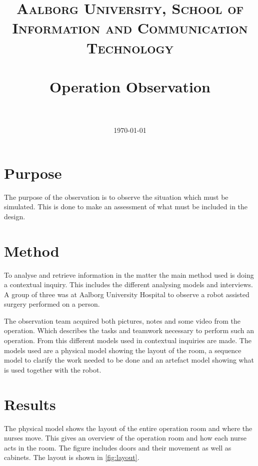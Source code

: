 \documentclass[paper=a4, fontsize=11pt]{scrartcl} %
\title{	
\normalfont \normalsize 
\textsc{Aalborg University, School of Information and Communication Technology} \\ [25pt] %
\horrule{0.5pt} \\[0.4cm] %
\huge Operation Observation \\ %
\horrule{2pt} \\[0.5cm] %
}
\date{\normalsize\today} %
\numberwithin{equation}{section} %
\numberwithin{figure}{section} %
\numberwithin{table}{section} %
\begin{document}
\maketitle %


\section{Purpose}
The purpose of the observation is to observe the situation which must be simulated. This is done to make an assessment of what must be included in the design.  

\section{Method}
To analyse and retrieve information in the matter the main method used is doing a contextual inquiry. This includes the different analysing models and interviews. A group of three was at Aalborg University Hospital to observe a robot assisted surgery performed on a person.

The observation team acquired both pictures, notes and some video from the operation. Which describes the tasks and teamwork necessary to perform such an operation. From this different models used in contextual inquiries are made. The models used are a physical model showing the layout of the room, a sequence model to clarify the work needed to be done and an artefact model showing what is used together with the robot.

\section{Results}
The physical model shows the layout of the entire operation room and where the nurses move. This gives an overview of the operation room and how each nurse acts in the room. The figure includes doors and their movement as well as cabinets. The layout is shown in \autoref{fig:layout}.
\end{document}

